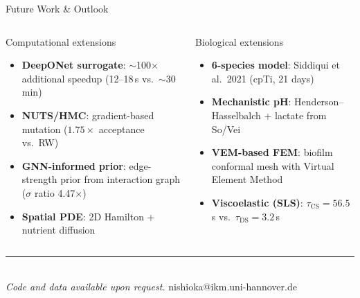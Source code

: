 \documentclass[aspectratio=169,10pt,t]{beamer}
\begin{document}
\begin{frame}[t]{Future Work \& Outlook}
  \small\vspace{-2pt}
  \begin{columns}[T]
      \begin{block}{Computational extensions}
        \begin{itemize}\setlength{\itemsep}{3pt}
          \item \textbf{DeepONet surrogate}: $\sim$100$\times$ additional speedup
                (12--18\,s vs.\ $\sim$30\,min)
          \item \textbf{NUTS/HMC}: gradient-based mutation
                ($1.75\times$ acceptance vs.\ RW)
          \item \textbf{GNN-informed prior}: edge-strength prior from
                interaction graph ($\sigma$ ratio 4.47$\times$)
          \item \textbf{Spatial PDE}: 2D Hamilton + nutrient diffusion
        \end{itemize}
      \end{block}
      \begin{block}{Biological extensions}
        \begin{itemize}\setlength{\itemsep}{3pt}
          \item \textbf{6-species model}: Siddiqui et al.\ 2021 (cpTi, 21 days)
          \item \textbf{Mechanistic pH}: Henderson--Hasselbalch
                + lactate from So/Vei
          \item \textbf{VEM-based FEM}: biofilm conformal mesh with
                Virtual Element Method
          \item \textbf{Viscoelastic (SLS)}: $\tau_{\mathrm{CS}}=56.5$\,s vs.\
                $\tau_{\mathrm{DS}}=3.2$\,s
        \end{itemize}
      \end{block}
  \end{columns}
  \vspace{10pt}
  \centering
  {\color{ikm}\rule{0.5\textwidth}{0.5pt}}\\[6pt]
  {\small\textit{Code and data available upon request.}}\quad
  {\small\color{midgray} nishioka@ikm.uni-hannover.de}
\end{frame}

\appendix
\end{document}

